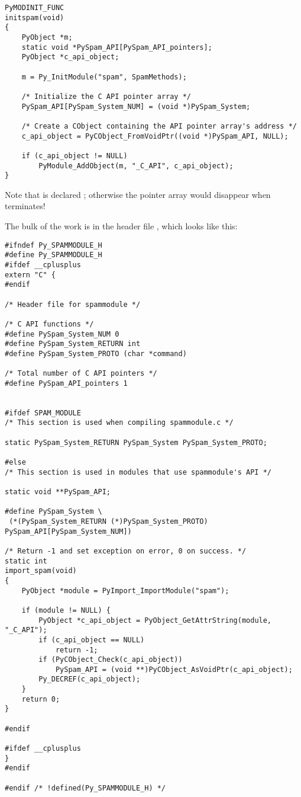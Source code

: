 \begin{verbatim}
PyMODINIT_FUNC
initspam(void)
{
    PyObject *m;
    static void *PySpam_API[PySpam_API_pointers];
    PyObject *c_api_object;

    m = Py_InitModule("spam", SpamMethods);

    /* Initialize the C API pointer array */
    PySpam_API[PySpam_System_NUM] = (void *)PySpam_System;

    /* Create a CObject containing the API pointer array's address */
    c_api_object = PyCObject_FromVoidPtr((void *)PySpam_API, NULL);

    if (c_api_object != NULL)
        PyModule_AddObject(m, "_C_API", c_api_object);
}
\end{verbatim}

Note that  is declared ; otherwise
the pointer array would disappear when  terminates!

The bulk of the work is in the header file ,
which looks like this:

\begin{verbatim}
#ifndef Py_SPAMMODULE_H
#define Py_SPAMMODULE_H
#ifdef __cplusplus
extern "C" {
#endif

/* Header file for spammodule */

/* C API functions */
#define PySpam_System_NUM 0
#define PySpam_System_RETURN int
#define PySpam_System_PROTO (char *command)

/* Total number of C API pointers */
#define PySpam_API_pointers 1


#ifdef SPAM_MODULE
/* This section is used when compiling spammodule.c */

static PySpam_System_RETURN PySpam_System PySpam_System_PROTO;

#else
/* This section is used in modules that use spammodule's API */

static void **PySpam_API;

#define PySpam_System \
 (*(PySpam_System_RETURN (*)PySpam_System_PROTO) PySpam_API[PySpam_System_NUM])

/* Return -1 and set exception on error, 0 on success. */
static int
import_spam(void)
{
    PyObject *module = PyImport_ImportModule("spam");

    if (module != NULL) {
        PyObject *c_api_object = PyObject_GetAttrString(module, "_C_API");
        if (c_api_object == NULL)
            return -1;
        if (PyCObject_Check(c_api_object))
            PySpam_API = (void **)PyCObject_AsVoidPtr(c_api_object);
        Py_DECREF(c_api_object);
    }
    return 0;
}

#endif

#ifdef __cplusplus
}
#endif

#endif /* !defined(Py_SPAMMODULE_H) */
\end{verbatim}

